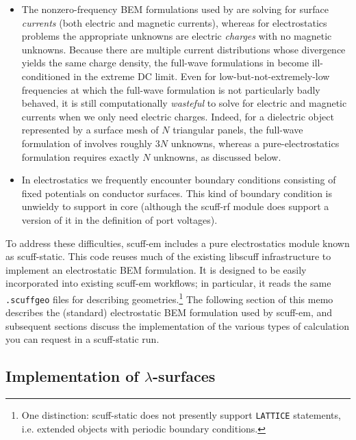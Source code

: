 \documentclass[letterpaper]{article}
\begin{document}
\begin{itemize}
 \item The nonzero-frequency BEM formulations
       used by \lss are solving for surface
       \textit{currents} (both electric and 
       magnetic currents), whereas for 
       electrostatics problems the appropriate 
       unknowns are electric \textit{charges} 
       with no magnetic unknowns. Because there 
       are multiple current distributions whose 
       divergence yields
       the same charge density, the full-wave
       formulations in \lss become ill-conditioned
       in the extreme DC limit. Even for 
       low-but-not-extremely-low frequencies
       at which the full-wave formulation is 
       not particularly badly behaved, it is 
       still computationally \textit{wasteful} 
       to solve for electric and magnetic currents
       when we only need electric charges.
       Indeed, for a dielectric object represented
       by a surface mesh of $N$ triangular panels,
       the full-wave formulation of \lss
       involves roughly $3N$ unknowns, whereas a
       pure-electrostatics formulation
       requires exactly $N$ unknowns, as discussed below.

 \item In electrostatics we frequently encounter
       boundary conditions consisting of fixed
       potentials on conductor surfaces. This 
       kind of boundary condition is unwieldy 
       to support in core \lss
       (although the {\sc scuff-rf} module 
       does support a version of it in the 
       definition of port voltages).

\end{itemize}
%
To address these difficulties, {\sc scuff-em} includes 
a pure electrostatics module known as {\sc scuff-static}.
This code reuses much of the existing {\sc libscuff}
infrastructure
to implement an electrostatic BEM formulation.
It is designed to be easily incorporated into 
existing {\sc scuff-em} workflows; in particular, it
reads the same \texttt{.scuffgeo} files for describing
geometries.\footnote{One distinction: {\sc scuff-static}
does not presently support {\texttt{LATTICE}} statements,
i.e. extended objects with periodic boundary conditions.}
The following section of this memo describes the 
(standard) electrostatic BEM formulation used by 
{\sc scuff-em}, and subsequent sections discuss
the implementation of the various types of calculation
you can request in a {\sc scuff-static} run.

\subsection*{Implementation of $\lambda$-surfaces}
\end{document}
